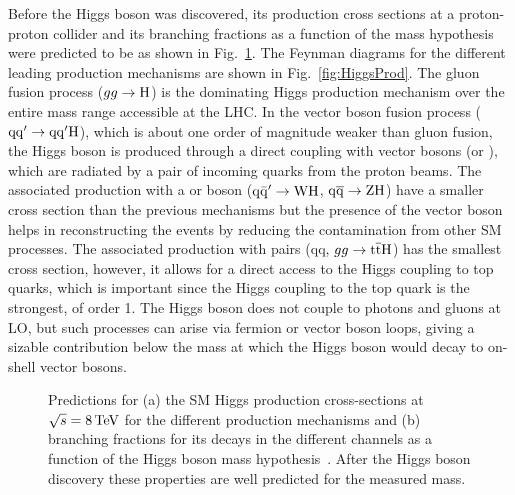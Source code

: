 Before the Higgs boson was discovered, its production cross sections at a proton-proton collider and its branching fractions as a function of the mass hypothesis were predicted to be as shown in Fig.~\ref{fig:HiggsXS}. 
The Feynman diagrams for the different leading production mechanisms are shown in Fig.~\ref{fig:HiggsProd}.
The gluon fusion process ($gg \to \mathrm{H}$) is the dominating Higgs production mechanism over the entire mass range accessible at the LHC.
In the vector boson fusion process ($\mathrm{qq}^\prime \to \mathrm{qq}^\prime \mathrm{H}$), which is about one order of magnitude weaker than gluon fusion, the Higgs boson is produced through a direct coupling with vector bosons (\PW or \PZ), which are radiated by a pair of incoming quarks from the proton beams. 
The associated production with a \PW or \PZ boson ($\mathrm{q\bar{q}}^\prime \to \mathrm{W}\mathrm{H}$, $\mathrm{q}\overline{\mathrm{q}} \to \mathrm{Z}\mathrm{H}$) have a smaller cross section than the previous mechanisms but the presence of the vector boson helps in reconstructing the events by reducing the contamination from other SM processes.
The associated production with \ttbar pairs (qq, $gg \to \mathrm{t}\overline{\mathrm{t}}\mathrm{H}$) has the smallest cross section, however, it allows for a direct access to the Higgs coupling to top quarks,
which is important since the Higgs coupling to the top quark is the strongest, of order 1.
The Higgs boson does not couple to photons and gluons at LO, but such processes can arise via fermion or vector boson loops, giving a sizable contribution
below the mass at which the Higgs boson would decay to on-shell vector bosons.\\

\begin{figure}[!htb]
\centering
{}
\caption{Predictions for (a) the SM Higgs production cross-sections at $\sqrt{s} = 8\,\text{Te\hspace{-.08em}V}$ for the different production mechanisms and (b) branching fractions for its decays in the different channels as a function of the Higgs boson mass hypothesis~\cite{Dittmaier:2011ti}. After the Higgs boson discovery these properties are well predicted for the measured mass.}
\label{fig:HiggsXS}
\end{figure}

